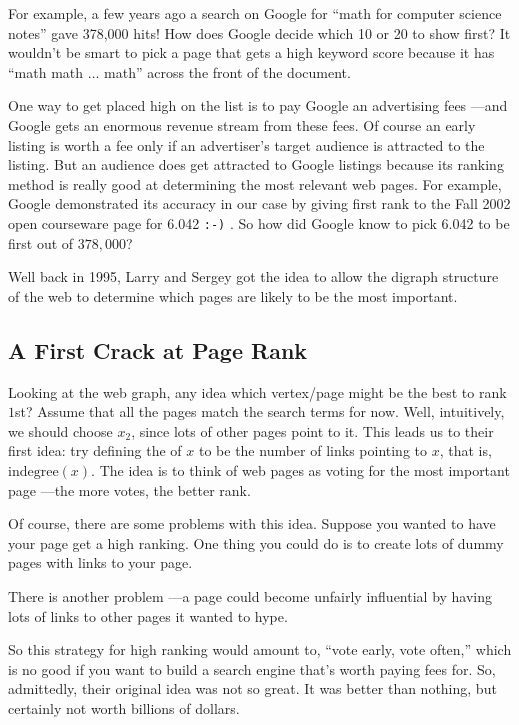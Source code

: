 For example, a few years ago a search on Google for ``math for computer
science notes'' gave 378,000 hits!  How does Google decide which 10 or 20
to show first?  It wouldn't be smart to pick a page that gets a high
keyword score because it has ``math math $\dots$ math'' across the front
of the document.

One way to get placed high on the list is to pay Google an advertising
fees ---and Google gets an enormous revenue stream from these fees.  Of
course an early listing is worth a fee only if an advertiser's target
audience is attracted to the listing.  But an audience does get attracted
to Google listings because its ranking method is really good at
determining the most relevant web pages.  For example, Google demonstrated
its accuracy in our case by giving first rank to the Fall 2002 open
courseware page for 6.042 \texttt{:-)} .  So how did Google know to pick
6.042 to be first out of $378,000$?

Well back in 1995, Larry and Sergey got the idea to allow the digraph
structure of the web to determine which pages are likely to be the most
important.

\subsection{A First Crack at Page Rank}

Looking at the web graph, any idea which vertex/page might be the best to
rank $1$st?  Assume that all the pages match the search terms for now.
Well, intuitively, we should choose $x_2$, since lots of other pages point
to it.  This leads us to their first idea: try defining the  of $x$ to be the number of links pointing to $x$, that is,
$\text{indegree}(x)$.  The idea is to think of web pages as voting for the
most important page ---the more votes, the better rank.

Of course, there are some problems with this idea.  Suppose you wanted
to have your page get a high ranking.  One thing you could do is to
create lots of dummy pages with links to your page.


There is another problem ---a page could become unfairly influential by
having lots of links to other pages it wanted to hype.


So this strategy for high ranking would amount to, ``vote early, vote
often,'' which is no good if you want to build a search engine that's
worth paying fees for.  So, admittedly, their original idea was not so
great.  It was better than nothing, but certainly not worth billions of
dollars.


